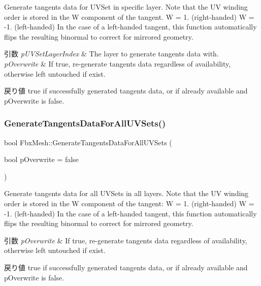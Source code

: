 Generate tangents data for U\+V\+Set in specific layer. Note that the UV winding order is stored in the W component of the tangent. W = 1. (right-\/handed) W = -\/1. (left-\/handed) In the case of a left-\/handed tangent, this function automatically flips the resulting binormal to correct for mirrored geometry. 
\begin{DoxyParams}{引数}
{\em p\+U\+V\+Set\+Layer\+Index} & The layer to generate tangents data with. \\
\hline
{\em p\+Overwrite} & If true, re-\/generate tangents data regardless of availability, otherwise left untouched if exist. \\
\hline
\end{DoxyParams}
\begin{DoxyReturn}{戻り値}
{\ttfamily true} if successfully generated tangents data, or if already available and p\+Overwrite is false. 
\end{DoxyReturn}
\mbox{\label{class_fbx_mesh_a0939d342aa2c0420c755dc1aa2594363}} 
\subsubsection{\texorpdfstring{Generate\+Tangents\+Data\+For\+All\+U\+V\+Sets()}{GenerateTangentsDataForAllUVSets()}}
{\footnotesize\ttfamily bool Fbx\+Mesh\+::\+Generate\+Tangents\+Data\+For\+All\+U\+V\+Sets (\begin{DoxyParamCaption}\item[{bool}]{p\+Overwrite = {\ttfamily false} }\end{DoxyParamCaption})}

Generate tangents data for all U\+V\+Sets in all layers. Note that the UV winding order is stored in the W component of the tangent\+: W = 1. (right-\/handed) W = -\/1. (left-\/handed) In the case of a left-\/handed tangent, this function automatically flips the resulting binormal to correct for mirrored geometry. 
\begin{DoxyParams}{引数}
{\em p\+Overwrite} & If true, re-\/generate tangents data regardless of availability, otherwise left untouched if exist. \\
\hline
\end{DoxyParams}
\begin{DoxyReturn}{戻り値}
{\ttfamily true} if successfully generated tangents data, or if already available and p\+Overwrite is false. 
\end{DoxyReturn}
\mbox{\label{class_fbx_mesh_a85b62b9c7da656bec19a362d60160836}} 

